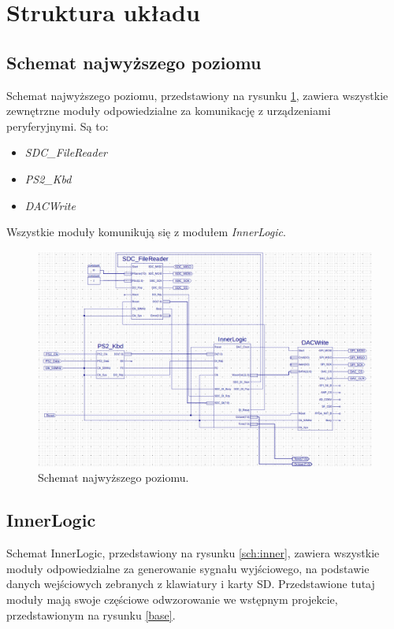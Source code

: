 \documentclass[a4paper,12pt]{article}
\begin{document}
\section{Struktura układu}
\subsection{Schemat najwyższego poziomu}
Schemat najwyższego poziomu, przedstawiony na rysunku \ref{sch:main}, zawiera wszystkie zewnętrzne moduły odpowiedzialne za komunikację z urządzeniami peryferyjnymi. Są to:
\begin{itemize}[noitemsep]
  \item \textit{SDC\_FileReader\cite{web:sdcfilereader}}
  \item \textit{PS2\_Kbd\cite{web:ps2kbd}}
  \item \textit{DACWrite\cite{web:dacwrite}}
\end{itemize}
Wszystkie moduły komunikują się z modułem \textit{InnerLogic}.


\begin{figure}[H]
  \centering
  \includegraphics[width=\linewidth]{images/main}
  \caption{Schemat najwyższego poziomu.}
  \label{sch:main}
\end{figure}

\subsection{InnerLogic}

Schemat InnerLogic, przedstawiony na rysunku \ref{sch:inner}, zawiera wszystkie moduły odpowiedzialne za generowanie sygnału wyjściowego, na podstawie danych wejściowych zebranych z klawiatury i karty SD. Przedstawione tutaj moduły mają swoje częściowe odwzorowanie we wstępnym projekcie, przedstawionym na rysunku \ref{base}.
\end{document}
